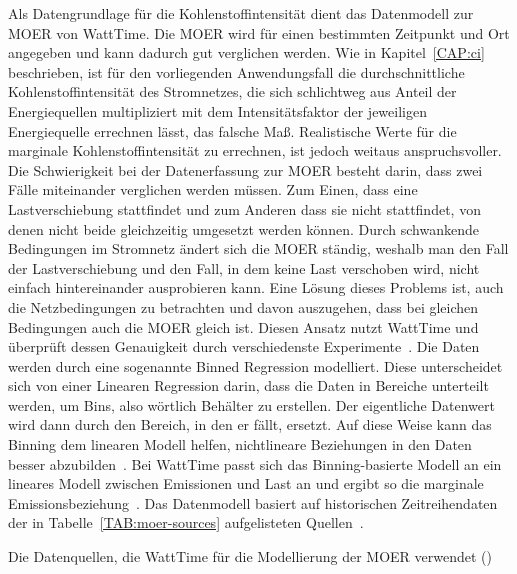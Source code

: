 Als Datengrundlage für die Kohlenstoffintensität dient das Datenmodell zur \ac{MOER} von WattTime.
Die \ac{MOER} wird für einen bestimmten Zeitpunkt und Ort angegeben und kann dadurch gut verglichen werden.
Wie in Kapitel~\ref{CAP:ci} beschrieben, ist für den vorliegenden Anwendungsfall die durchschnittliche Kohlenstoffintensität des Stromnetzes, die sich schlichtweg aus Anteil der Energiequellen multipliziert mit dem Intensitätsfaktor der jeweiligen Energiequelle errechnen lässt, das falsche Maß.
Realistische Werte für die marginale Kohlenstoffintensität zu errechnen, ist jedoch weitaus anspruchsvoller.
Die Schwierigkeit bei der Datenerfassung zur \ac{MOER} besteht darin, dass zwei Fälle miteinander verglichen werden müssen.
Zum Einen, dass eine Lastverschiebung stattfindet und zum Anderen dass sie nicht stattfindet, von denen nicht beide gleichzeitig umgesetzt werden können.
Durch schwankende Bedingungen im Stromnetz ändert sich die \ac{MOER} ständig, weshalb man den Fall der Lastverschiebung und den Fall, in dem keine Last verschoben wird, nicht einfach hintereinander ausprobieren kann.
Eine Lösung dieses Problems ist, auch die Netzbedingungen zu betrachten und davon auszugehen, dass bei gleichen Bedingungen auch die \ac{MOER} gleich ist.
Diesen Ansatz nutzt WattTime und überprüft dessen Genauigkeit durch verschiedenste Experimente~\cite{WattTime.2022}.
Die Daten werden durch eine sogenannte Binned Regression modelliert.
Diese unterscheidet sich von einer Linearen Regression darin, dass die Daten in Bereiche unterteilt werden, um \glqq Bins\grqq{}, also wörtlich Behälter zu erstellen.
Der eigentliche Datenwert wird dann durch den Bereich, in den er fällt, ersetzt.
Auf diese Weise kann das \glqq Binning\grqq{} dem linearen Modell helfen, nichtlineare Beziehungen in den Daten besser abzubilden~\cite{Muller.2017}.
Bei WattTime passt sich das Binning-basierte Modell an ein lineares Modell zwischen Emissionen und Last an und ergibt so die marginale Emissionsbeziehung~\cite{WattTime.2022}.
Das Datenmodell basiert auf historischen Zeitreihendaten der in Tabelle~\ref{TAB:moer-sources} aufgelisteten Quellen~\cite{WattTime.11.2023}.
\begin{table}[t]
 \caption[Datenquellen MOER Modellierung]{Die Datenquellen, die WattTime für die Modellierung der MOER verwendet (\cite{WattTime.2023})}
 \label{TAB:moer-sources}
 
\end{table}

